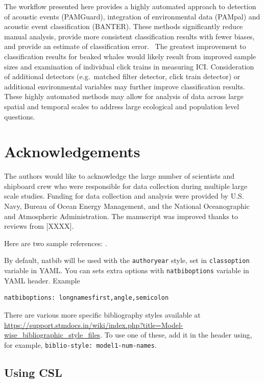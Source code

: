 \documentclass[
  authoryear,
  preprint,
  3p]{elsarticle}
\begin{document}
The workflow presented here provides a highly automated approach to
detection of acoustic events (PAMGuard), integration of environmental
data (PAMpal) and acoustic event classification (BANTER). These methods
significantly reduce manual analysis, provide more consistent
classification results with fewer biases, and provide an estimate of
classification error.~ The greatest improvement to classification
results for beaked whales would likely result from improved sample sizes
and examination of individual click trains in measuring ICI.
Consideration of additional detectors (e.g.~matched filter detector,
click train detector) or additional environmental variables may further
improve classification results. These highly automated methods may allow
for analysis of data across large spatial and temporal scales to address
large ecological and population level questions.

\hypertarget{acknowledgements}{%
\section{Acknowledgements}\label{acknowledgements}}

The authors would like to acknowledge the large number of scientists and
shipboard crew who were responsible for data collection during multiple
large scale studies. Funding for data collection and analysis were
provided by U.S. Navy, Bureau of Ocean Energy Management, and the
National Oceanographic and Atmospheric Administration. The manuscript
was improved thanks to reviews from {[}XXXX{]}.

Here are two sample references: \citet{Feynman1963118}
\citet{Dirac1953888}.

By default, natbib will be used with the \texttt{authoryear} style, set
in \texttt{classoption} variable in YAML. You can sets extra options
with \texttt{natbiboptions} variable in YAML header. Example

\begin{verbatim}
natbiboptions: longnamesfirst,angle,semicolon
\end{verbatim}

There are various more specific bibliography styles available at
\url{https://support.stmdocs.in/wiki/index.php?title=Model-wise_bibliographic_style_files}.
To use one of these, add it in the header using, for example,
\texttt{biblio-style:\ model1-num-names}.

\hypertarget{using-csl}{%
\subsection{Using CSL}\label{using-csl}}
\end{document}
